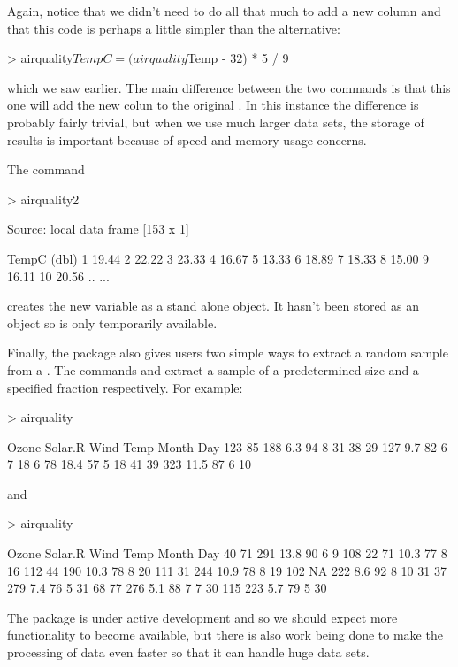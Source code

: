 Again, notice that we didn't need to do all that much to add a new column and that this code is perhaps a little simpler than the alternative: 
\begin{Schunk}
\begin{Sinput}
> airquality$TempC = (airquality$Temp - 32) * 5 / 9 
\end{Sinput}
\end{Schunk}
which we saw earlier. The main difference between the two commands is that this one will add the new colun to the original . 
In this instance the difference is probably fairly trivial, but when we use much larger data sets, the storage of results is important because of speed and memory usage concerns. 
 
The command 
\begin{Schunk}
\begin{Sinput}
> airquality2 %>% transmute(TempC = (Temp - 32) * 5 / 9) 
\end{Sinput}
\begin{Soutput}
Source: local data frame [153 x 1]

   TempC
   (dbl)
1  19.44
2  22.22
3  23.33
4  16.67
5  13.33
6  18.89
7  18.33
8  15.00
9  16.11
10 20.56
..   ...
\end{Soutput}
\end{Schunk}
creates the new variable as a stand alone object. It hasn't been stored as an object so is only temporarily available.  
 
Finally, the  package also gives users two simple ways to extract a random sample from a . The commands  and   
extract a sample of a predetermined size and a specified fraction respectively. For example: 
\begin{Schunk}
\begin{Sinput}
> airquality %>% sample_n(4) 
\end{Sinput}
\begin{Soutput}
    Ozone Solar.R Wind Temp Month Day
123    85     188  6.3   94     8  31
38     29     127  9.7   82     6   7
18      6      78 18.4   57     5  18
41     39     323 11.5   87     6  10
\end{Soutput}
\end{Schunk}
and 
\begin{Schunk}
\begin{Sinput}
> airquality %>% sample_frac(0.05) 
\end{Sinput}
\begin{Soutput}
    Ozone Solar.R Wind Temp Month Day
40     71     291 13.8   90     6   9
108    22      71 10.3   77     8  16
112    44     190 10.3   78     8  20
111    31     244 10.9   78     8  19
102    NA     222  8.6   92     8  10
31     37     279  7.4   76     5  31
68     77     276  5.1   88     7   7
30    115     223  5.7   79     5  30
\end{Soutput}
\end{Schunk}
 
The   package is under active development and so we should expect more functionality to become available, but there is also work being done to make the processing of data even faster so that it can handle huge data sets. 
 

